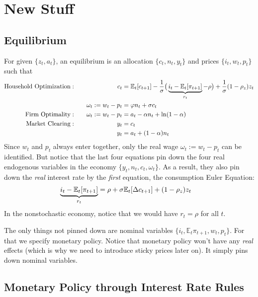 \documentclass[12pt]{article}
\theoremstyle{plain}
\theoremstyle{definition}
\theoremstyle{remark}
\newcommand{\E}{\mathbb{E}}
\begin{document}
\clearpage
\section{New Stuff}
\subsection{Equilibrium}

For given $\{z_t,a_t\}$, an equilibrium is an allocation
$\{c_t,n_t,y_t\}$ and prices $\{i_t,w_t,p_t\}$ such that
\begin{alignat*}{3}
  \text{Household Optimization}:&&
  \qquad\qquad
      c_{t}
      &=
      \E_t[c_{t+1}]
      -
      \frac{1}{\sigma}
      \big(
      \underbrace{%
      i_t-\E_t[\pi_{t+1}]
      }_{r_t}
      -\rho
      \big)
      +
      \frac{1}{\sigma}
      (1-\rho_z) z_t
      \\
      &&
      \omega_t:=
      w_t - p_t
      &=
      \varphi n_t
      + \sigma c_t
      \\
  \text{Firm Optimality}:&&\quad
      \omega_t:=w_t - p_t &= a_t - \alpha n_t + \ln(1-\alpha)
      \\
  \text{Market Clearing}:&&
    y_t &= c_t \\
    && y_t &= a_t + (1-\alpha)n_t
\end{alignat*}
Since $w_t$ and $p_t$ always enter together, only the real wage
$\omega_t:=w_t-p_t$ can be identified. But notice that the last four
equations pin down the four real endogenous variables in the economy
$\{y_t,n_t,c_t,\omega_t\}$. As a result, they also pin down the
\emph{real} interest rate by the \emph{first} equation, the consumption
Euler Equation:
\begin{align*}
    \underbrace{%
    i_t-\E_t[\pi_{t+1}]
    }_{r_t}
    &=
    \rho
    + \sigma \E_t[\Delta c_{t+1}]
    + (1-\rho_z) z_t
\end{align*}
In the nonstochastic economy, notice that we would have $r_t=\rho$ for
all $t$.

The only things not pinned down are nominal variables
$\{i_t,\E_t\pi_{t+1},w_t,p_t\}$. For that we specify monetary policy.
Notice that monetary policy won't have any \emph{real} effects (which is
why we need to introduce sticky prices later on). It simply pins down
nominal variables.


\subsection{Monetary Policy through Interest Rate Rules}
\end{document}
